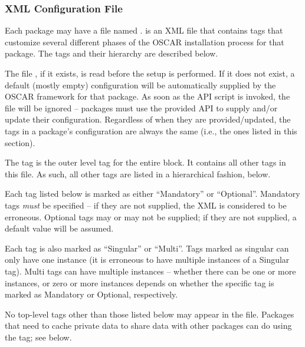 
\subsubsection{XML Configuration File}
\label{sec:config-xml}

\begchange

Each package may have a file named .
 is an XML file that contains tags that customize
several different phases of the OSCAR installation process for that
package.  The tags and their hierarchy are described below.

The file , if it exists, is read before the
 setup is performed.  If it does not exist, a default
(mostly empty) configuration will be automatically supplied by the
OSCAR framework for that package.  As soon as the  API
script is invoked, the  file will be ignored --
packages must use the provided API to supply and/or update their
configuration.  Regardless of when they are provided/updated, the tags
in a package's configuration are always the same (i.e., the ones
listed in this section).

The  tag is the outer level tag for the entire block.
It contains all other tags in this file.  As such, all other tags are
listed in a hierarchical fashion, below.

Each tag listed below is marked as either ``Mandatory'' or
``Optional''.  Mandatory tags {\em must} be specified -- if they are
not supplied, the XML is considered to be erroneous.  Optional tags
may or may not be supplied; if they are not supplied, a default value
will be assumed.

Each tag is also marked as ``Singular'' or ``Multi''.  Tags marked as
singular can only have one instance (it is erroneous to have multiple
instances of a Singular tag).  Multi tags can have multiple instances
-- whether there can be one or more instances, or zero or more
instances depends on whether the specific tag is marked as Mandatory
or Optional, respectively.

No top-level tags other than those listed below may appear in the
 file.  Packages that need to cache private data to
share data with other packages can do using the  tag;
see below.

